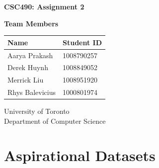 \documentclass[a4paper,12pt]{article}
\begin{document}
\begin{titlepage}
    \centering
    \vspace*{1cm}
    
    \Huge
    \textbf{CSC490: Assignment 2}
    
    \vspace{0.5cm}
    
    \vspace{1.5cm}
    
    \textbf{Team Members}
    
    \vspace{0.8cm}
    
    \large
    \begin{tabular}{ll}
        \textbf{Name} & \textbf{Student ID} \\
        \midrule
        Aarya Prakash & 1008790257 \\
        Derek Huynh & 1008849052 \\
        Merrick Liu & 1008951920 \\
        Rhys Balevicius & 1000801974 \\
    \end{tabular}
    
    \vfill
    
    \large
    University of Toronto\\
    Department of Computer Science    
\end{titlepage}



%
%
%
%
%


\section{Aspirational Datasets}

\end{document}
